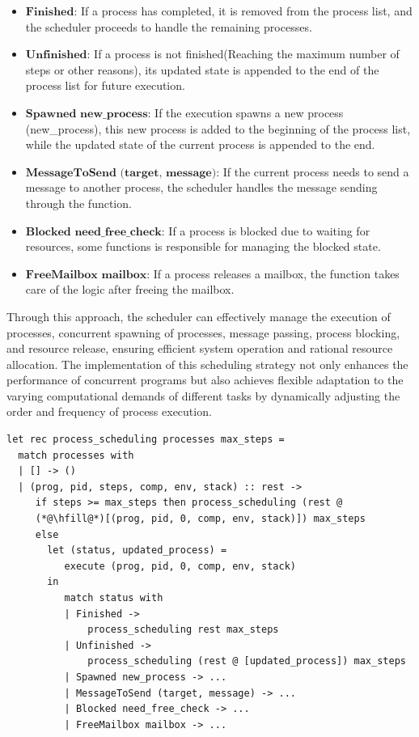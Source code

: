\documentclass{l4proj}
\begin{document}
\begin{itemize}
\item $\textbf{Finished}$: If a process has completed, it is removed from the process list, and the scheduler proceeds to handle the remaining processes.
\item $\textbf{Unfinished}$: If a process is not finished(Reaching the maximum number of steps or other reasons), its updated state is appended to the end of the process list for future execution.
\item $\textbf{Spawned new\_process}$: If the execution spawns a new process (new\_process), this new process is added to the beginning of the process list, while the updated state of the current process is appended to the end.
\item $\textbf{MessageToSend (target, message)}$: If the current process needs to send a message to another process, the scheduler handles the message sending through the function.
\item $\textbf{Blocked need\_free\_check}$: If a process is blocked due to waiting for resources, some functions is responsible for managing the blocked state.
\item $\textbf{FreeMailbox mailbox}$: If a process releases a mailbox, the function takes care of the logic after freeing the mailbox.
\end{itemize}

Through this approach, the scheduler can effectively manage the execution of processes, concurrent spawning of processes, message passing, process blocking, and resource release, ensuring efficient system operation and rational resource allocation. The implementation of this scheduling strategy not only enhances the performance of concurrent programs but also achieves flexible adaptation to the varying computational demands of different tasks by dynamically adjusting the order and frequency of process execution.

\noindent\begin{minipage}{\linewidth}
\lstset{style=Ocamlstyle,}
\begin{lstlisting}[caption={Implementation of a round-robin scheduler based on evaluation steps in the Pat language}, label={lst:Scheduler}]
let rec process_scheduling processes max_steps =
  match processes with
  | [] -> ()
  | (prog, pid, steps, comp, env, stack) :: rest ->
     if steps >= max_steps then process_scheduling (rest @
     (*@\hfill@*)[(prog, pid, 0, comp, env, stack)]) max_steps
     else
       let (status, updated_process) = 
          execute (prog, pid, 0, comp, env, stack) 
       in
          match status with
          | Finished -> 
              process_scheduling rest max_steps
          | Unfinished -> 
              process_scheduling (rest @ [updated_process]) max_steps
          | Spawned new_process -> ...
          | MessageToSend (target, message) -> ...
          | Blocked need_free_check -> ...
          | FreeMailbox mailbox -> ...

\end{lstlisting}
\end{minipage}
\end{document}
